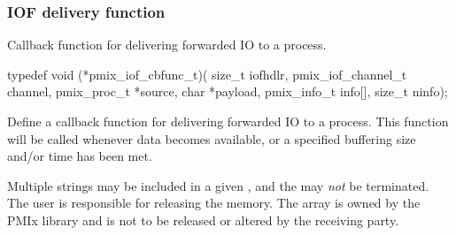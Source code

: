 \subsubsection{IOF delivery function}

\summary

Callback function for delivering forwarded \ac{IO} to a process.

\format

\cspecificstart
\begin{codepar}
typedef void (*pmix_iof_cbfunc_t)(
                    size_t iofhdlr, pmix_iof_channel_t channel,
                    pmix_proc_t *source, char *payload,
                    pmix_info_t info[], size_t ninfo);
\end{codepar}
\cspecificend

\begin{arglist}
\end{arglist}

\descr

Define a callback function for delivering forwarded \ac{IO} to a process. This function will be called whenever data becomes available, or a
specified buffering size and/or time has been met.

\adviceuserstart
Multiple strings may be included in a given , and the  may \textit{not} be  terminated. The user is responsible for releasing the  memory. The  array is owned by the \ac{PMIx} library and is not to be released or altered by the receiving party.
\adviceuserend


\subsection{}

